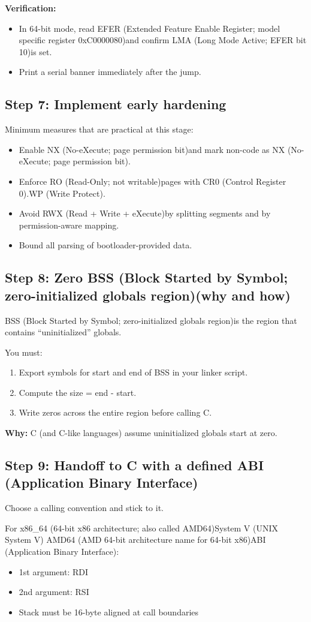 \documentclass[11pt]{article}
\newcommand{\ABI}{ABI (Application Binary Interface)}
\newcommand{\AMDsixtyfour}{AMD64 (AMD 64-bit architecture name for 64-bit x86)}
\newcommand{\BSS}{BSS (Block Started by Symbol; zero-initialized globals region)}
\newcommand{\CRzero}{CR0 (Control Register 0)}
\newcommand{\EFER}{EFER (Extended Feature Enable Register; model specific register 0xC0000080)}
\newcommand{\LMA}{LMA (Long Mode Active; EFER bit 10)}
\newcommand{\NX}{NX (No-eXecute; page permission bit)}
\newcommand{\RO}{RO (Read-Only; not writable)}
\newcommand{\RWX}{RWX (Read + Write + eXecute)}
\newcommand{\SysV}{System V (UNIX System V) \AMDsixtyfour ABI (Application Binary Interface)}
\newcommand{\WP}{WP (Write Protect)}
\newcommand{\xEightySixSixtyFour}{x86\_64 (64-bit x86 architecture; also called AMD64)}
\begin{document}
\textbf{Verification:}
\begin{itemize}
  \item In 64-bit mode, read \EFER and confirm \LMA is set.
  \item Print a serial banner immediately after the jump.
\end{itemize}

\subsection{Step 7: Implement early hardening}
Minimum measures that are practical at this stage:
\begin{itemize}
  \item Enable \NX and mark non-code as \NX.
  \item Enforce \RO pages with \CRzero.\WP.
  \item Avoid \RWX by splitting segments and by permission-aware mapping.
  \item Bound all parsing of bootloader-provided data.
\end{itemize}

\subsection{Step 8: Zero \BSS (why and how)}
\BSS is the region that contains ``uninitialized'' globals.

You must:
\begin{enumerate}
  \item Export symbols for start and end of BSS in your linker script.
  \item Compute the size = end - start.
  \item Write zeros across the entire region before calling C.
\end{enumerate}

\textbf{Why:} C (and C-like languages) assume uninitialized globals start at zero.

\subsection{Step 9: Handoff to C with a defined \ABI}
Choose a calling convention and stick to it.

For \xEightySixSixtyFour \SysV:
\begin{itemize}
  \item 1st argument: RDI
  \item 2nd argument: RSI
  \item Stack must be 16-byte aligned at call boundaries
\end{itemize}
\end{document}
